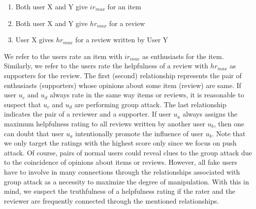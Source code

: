 \documentclass[master,english,final]{kaist-ucs}
\begin{document}
\begin{enumerate}
\item Both user X and Y give $ir_{max}$ for an item
\item Both user X and Y give $hr_{max}$ for a review
\item User X gives $hr_{max}$ for a review written by User Y
\end{enumerate}

We refer to the users rate an item with $ir_{max}$ as enthusiasts for the item.
Similarly, we refer to the users rate the helpfulness of a review with $hr_{max}$ as supporters for the review.
The first (second) relationship represents the pair of enthusiasts (supporters) whose opinions about some item (review) are same.
If user $u_c$ and $u_d$ always rate in the same way items or reviews, it is reasonable to suspect that $u_c$ and $u_d$ are performing group attack.
The last relationship indicates the pair of a reviewer and a supporter.
If user $u_a$ always assigns the maximum helpfulness rating to all reviews written by another user $u_b$, then one can doubt that user $u_a$ intentionally promote the influence of user $u_b$.
Note that we only target the ratings with the highest score only since we focus on push attack.
Of course, pairs of normal users could reveal clues to the group attack due to the coincidence of opinions about items or reviews.
However, all fake users have to involve in many connections through the relationships associated with group attack as a necessity to maximize the degree of manipulation.
With this in mind, we suspect the truthfulness of a helpfulness rating if the rater and the reviewer are frequently connected through the mentioned relationships.
\end{document}
